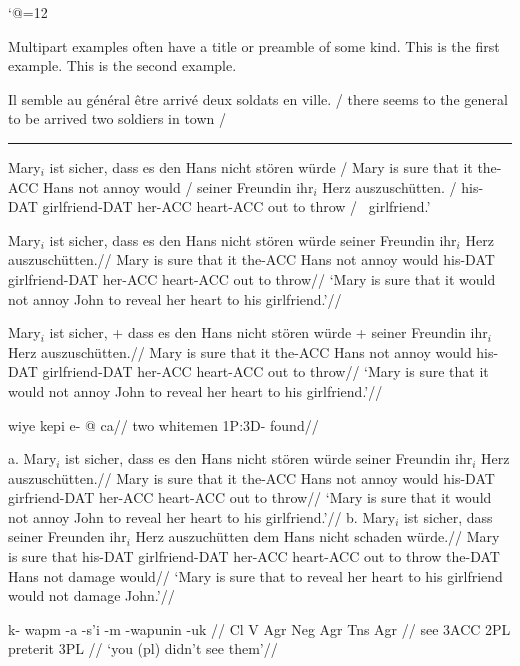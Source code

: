 \documentclass{article}
\begin{document}
\fi
\catcode`@=12

\pex Multipart examples often have a title or preamble of some kind.
\a This is the first example.
\a This is the second example.
\xe

\ex
\begingl
\gla Il semble au g\'en\'eral \^etre arriv\'e deux soldats en
ville. /
\glb there seems {to the} general {to be} arrived two soldiers in
town /
\endgl
\xe

\def\suff#1{{-\small #1}}%

\hrule
\ex[abovemoreglskip=.5ex,moregloffset=1em,aboveglcskip=1ex]
\begingl
\gla Mary$_i$ ist sicher, dass es den Hans nicht st\"oren w\"urde /
\glb Mary is sure that it the\suff{ACC} Hans not annoy would /
\moregl
\gla seiner Freundin ihr$_i$ Herz auszusch\"utten. /
\glb his\suff{DAT} girlfriend\suff{DAT} her\suff{ACC} heart\suff{ACC}
{out to throw} /
\glc~{girlfriend.'}
\endgl
\xe


\ex
\begingl
\gla Mary$_i$ ist sicher, dass es den Hans nicht st\"oren w\"urde
seiner Freundin ihr$_i$ Herz auszusch\"utten.//
\glb Mary is sure that it the\suff{ACC} Hans not annoy would
his\suff{DAT} girlfriend\suff{DAT} her\suff{ACC} heart\suff{ACC} {out to
throw}//
\glft  `Mary is sure that it would not annoy John to reveal her
heart to his girlfriend.'//
\endgl
\xe

\ex
\begingl
\gla Mary$_i$ ist sicher, + dass es den Hans nicht st\"oren w\"urde
+ seiner Freundin ihr$_i$ Herz auszusch\"utten.//
\glb Mary is sure that it the\suff{ACC} Hans not annoy would
his\suff{DAT} girlfriend\suff{DAT} her\suff{ACC} heart\suff{ACC} {out to
throw}//
\glft  `Mary is sure that it would not annoy John to reveal her
heart to his girlfriend.'//
\endgl
\xe

\ex
\begingl
\gla wiye kepi e- @ ca//
\glb two whitemen \small1P:3D- found//
\endgl
\xe

\ex
a.\quad
\begingl[glwidth=.4\hsize]
\gla Mary$_i$ ist sicher, dass es den Hans nicht st\"oren w\"urde
seiner Freundin ihr$_i$ Herz auszusch\"utten.//
\glb Mary is sure that it the\suff{ACC} Hans not annoy would
his\suff{DAT} girfriend\suff{DAT} her\suff{ACC} heart\suff{ACC} {out to
throw}//
\glft  `Mary is sure that it would not annoy John to reveal her
heart to his girlfriend.'//
\endgl
\hfil
b.\quad
\begingl[glwidth=.4\hsize]
\gla Mary$_i$ ist sicher, dass seiner Freunden ihr$_i$ Herz
auszuch\"utten dem Hans nicht schaden w\"urde.//
\glb Mary is sure that his\suff{DAT} girlfriend\suff{DAT} her\suff{ACC}
heart\suff{ACC} {out to throw} the\suff{DAT} Hans not damage would//
\glft `Mary is sure that to reveal her heart to his girlfriend
would not damage John.'//
\endgl
\xe

\ex[glstyle=multilevel,everygla=,everyglb=,everyglc=,
   aboveglaskip=0pt,aboveglbskip=0pt,aboveglftskip=1ex]
\begingl
\gla k- wapm -a -s'i -m -wapunin -uk //
\glb Cl V Agr Neg Agr Tns Agr //
 see {3\small ACC} {} 2{\small PL} preterit 3{\small PL} //
\glft `you (pl) didn't see them'//
\endgl
\xe
\end{document}
